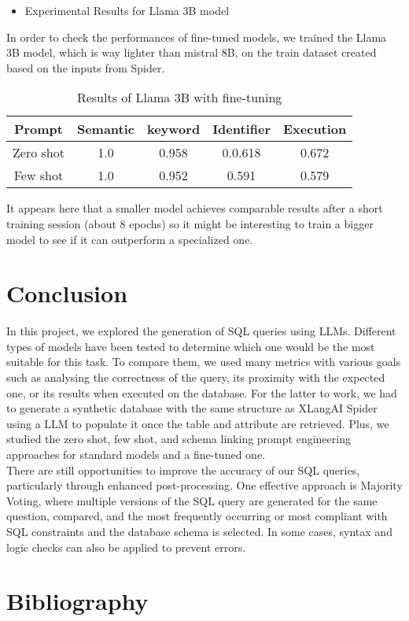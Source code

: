 \documentclass[12pt,a4paper]{article}
\begin{document}
\begin{itemize}
\item Experimental Results for Llama 3B model
\end{itemize}
In order to check the performances of fine-tuned models, we trained the Llama 3B model, which is way lighter than mistral 8B, on the train dataset created based on the inputs from Spider. 
\begin{table}[h]
    \centering
    \begin{tabular}{|c|c|c|c|c|}
        \hline
         \textbf{Prompt}& \textbf{Semantic} & \textbf{keyword}&\textbf{Identifier}& \textbf{Execution}\\
         \hline
         Zero shot& 1.0&0.958&0.0.618&0.672\\
         Few shot& 1.0&0.952&0.591&0.579\\
         \hline
    \end{tabular}
    \caption{Results of Llama 3B with fine-tuning}
    \label{tab:my_label}
\end{table}

It appears here that a smaller model achieves comparable results after a short training session (about 8 epochs) so it might be interesting to train a bigger model to see if it can outperform a specialized one.
\section*{Conclusion}

In this project, we explored the generation of SQL queries using LLMs. Different types of models have been tested to determine which one would be the most suitable for this task. To compare them, we used many metrics with various goals such as analysing the correctness of the query, its proximity with the expected one, or its results when executed on the database. For the latter to work, we had to generate a synthetic database with the same structure as XLangAI Spider using a LLM to populate it once the table and attribute are retrieved. Plus, we studied the zero shot, few shot, and schema linking prompt engineering approaches for standard models and a fine-tuned one.\\
There are still opportunities to improve the accuracy of our SQL queries, particularly through enhanced post-processing. One effective approach is Majority Voting, where multiple versions of the SQL query are generated for the same question, compared, and the most frequently occurring or most compliant with SQL constraints and the database schema is selected. In some cases, syntax and logic checks can also be applied to prevent errors.

\section*{Bibliography}


\end{document}
